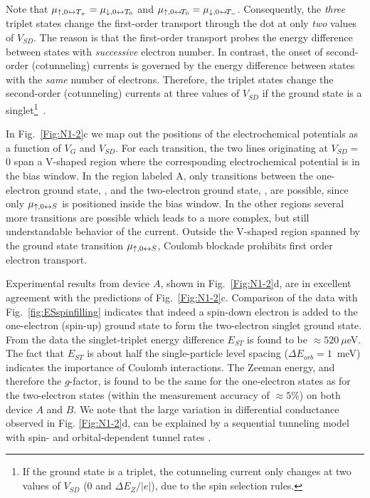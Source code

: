 \documentclass[12pt,aps,nofootinbib]{revtex4-1}
\begin{document}
Note that $\mu_{\uparrow,0 \leftrightarrow T_+} = \mu_{\downarrow,0
\leftrightarrow T_0}$ and $\mu_{\uparrow,0 \leftrightarrow \!T_0} =
\mu_{\downarrow,0 \leftrightarrow \!T_-}$. Consequently, the
\textit{three} triplet states change the first-order transport
through the dot at only \textit{two} values of $V_{SD}$. The
reason is that the first-order transport probes the energy
difference between states with \textit{successive} electron
number. In contrast, the onset of second-order (cotunneling)
currents is governed by the energy difference between states with
the \textit{same} number of electrons. Therefore, the triplet
states change the second-order (cotunneling) currents at three
values of $V_{SD}$ if the ground state is a singlet\footnote{If
the ground state is a triplet, the cotunneling current only
changes at two values of $V_{SD}$ (0 and $\Delta E_Z/|e|$), due to
the spin selection rules.}~\cite{PaaskeNatPhys2006}.

In Fig.~\ref{Fig:N1-2}c we map out the positions of the
electrochemical potentials as a function of $V_G$ and $V_{SD}$.
For each transition, the two lines originating at $V_{SD}\!=\!$ 0
span a V-shaped region where the corresponding electrochemical
potential is in the bias window. In the region labeled A, only
transitions between the one-electron ground state, ,
and the two-electron ground state, , are possible, since
only $\mu_{\uparrow,0 \leftrightarrow S}$ is positioned inside the bias
window. In the other regions several more transitions are possible
which leads to a more complex, but still understandable behavior
of the current. Outside the V-shaped region spanned by the ground
state transition $\mu_{\uparrow,0\leftrightarrow S}$, Coulomb blockade
prohibits first order electron transport.

Experimental results from device $A$, shown in
Fig.~\ref{Fig:N1-2}d, are in excellent agreement with the
predictions of Fig.~\ref{Fig:N1-2}c. Comparison of the data with
Fig.~\ref{fig:ESspinfilling} indicates that indeed a spin-down
electron is added to the one-electron (spin-up) ground state to
form the two-electron singlet ground state. From the data the
singlet-triplet energy difference $E_{ST}$ is found to be
$\approx 520~\mu$eV. The fact that $E_{ST}$ is about half the
single-particle level spacing ($\Delta E_{orb}=1$~meV) indicates
the importance of Coulomb interactions. The Zeeman energy, and
therefore the $g$-factor, is found to be the same for the
one-electron states as for the two-electron states (within the
measurement accuracy of $\approx\!5\%$) on both device $A$ and
$B$. We note that the large variation in differential conductance
observed in Fig. \ref{Fig:N1-2}d, can be explained by a sequential
tunneling model with spin- and orbital-dependent tunnel rates
\cite{RonaldMoriond}.
\end{document}

